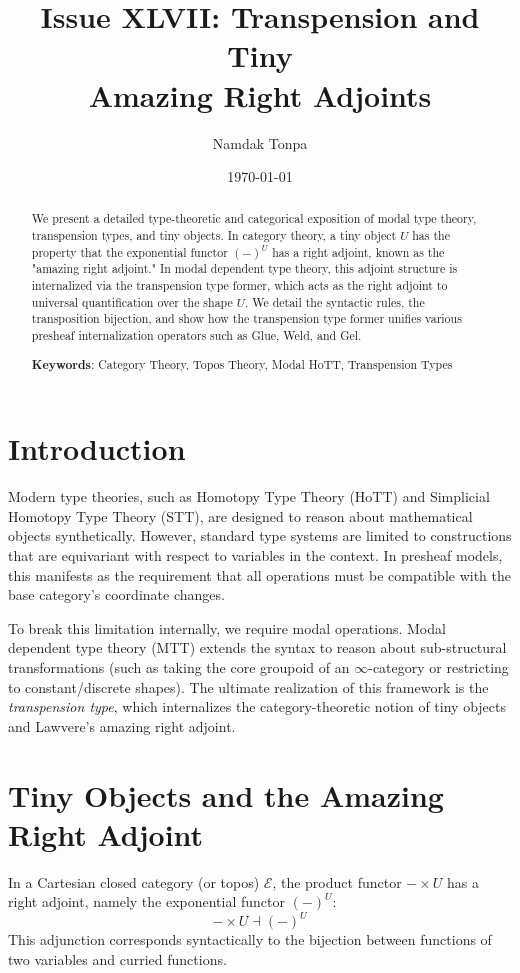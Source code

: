 \documentclass{article}
\begin{document}
\title{Issue XLVII: Transpension and Tiny \\ Amazing Right Adjoints}
\author{Namdak Tonpa}
\date{\today}

\maketitle

\begin{abstract}
We present a detailed type-theoretic and categorical exposition of modal type theory, transpension types, and tiny objects. In category theory, a tiny object $U$ has the property that the exponential functor $(-)^U$ has a right adjoint, known as the "amazing right adjoint." In modal dependent type theory, this adjoint structure is internalized via the transpension type former, which acts as the right adjoint to universal quantification over the shape $U$. We detail the syntactic rules, the transposition bijection, and show how the transpension type former unifies various presheaf internalization operators such as Glue, Weld, and Gel.

{\bf Keywords}: Category Theory, Topos Theory, Modal HoTT, Transpension Types \\
\end{abstract}

\ifincludeTOC
  \tableofcontents
\fi

\section{Introduction}
Modern type theories, such as Homotopy Type Theory (HoTT) and Simplicial Homotopy Type Theory (STT), are designed to reason about mathematical objects synthetically. However, standard type systems are limited to constructions that are equivariant with respect to variables in the context. In presheaf models, this manifests as the requirement that all operations must be compatible with the base category's coordinate changes.

To break this limitation internally, we require modal operations. Modal dependent type theory (MTT) extends the syntax to reason about sub-structural transformations (such as taking the core groupoid of an $\infty$-category or restricting to constant/discrete shapes). The ultimate realization of this framework is the \emph{transpension type}, which internalizes the category-theoretic notion of tiny objects and Lawvere's amazing right adjoint.

\section{Tiny Objects and the Amazing Right Adjoint}
In a Cartesian closed category (or topos) $\mathcal{E}$, the product functor $- \times U$ has a right adjoint, namely the exponential functor $(-)^U$:
\[
- \times U \dashv (-)^U
\]
This adjunction corresponds syntactically to the bijection between functions of two variables and curried functions.
\end{document}
